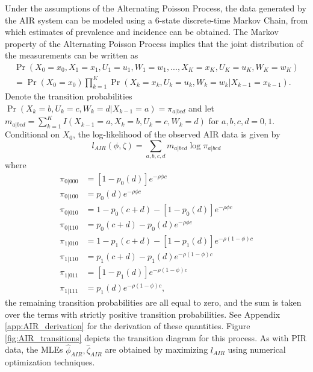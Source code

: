 \documentclass[man, noextraspace, floatsintext]{apa6}\usepackage[]{graphicx}\usepackage[]{color}
\begin{document}
Under the assumptions of the Alternating Poisson Process, the data generated by the AIR system can be modeled using a 6-state discrete-time Markov Chain, from which estimates of prevalence and incidence can be obtained. 
The Markov property of the Alternating Poisson Process implies that the joint distribution of the measurements can be written as
\begin{multline}
\Pr\left(X_0=x_0,X_1=x_1,U_1 = u_1, W_1 = w_1,..., X_K=x_K, U_K = u_K, W_K = w_K \right) \\ = \Pr\left(X_0 = x_0\right) \prod_{k=1}^{K} \Pr\left(X_k = x_k, U_k = u_k, W_k = w_k | X_{k-1} = x_{k-1}\right). 
\end{multline}
Denote the transition probabilities $\Pr\left(X_k = b, U_k = c, W_k = d | X_{k-1} = a\right) = \pi_{a|bcd}$ and let $m_{a|bcd} = \sum_{k=1}^{K} I\left(X_{k-1} = a, X_k = b, U_k = c, W_k = d \right)$ for $a,b,c,d = 0,1$. 
Conditional on $X_0$, the log-likelihood of the observed AIR data is given by
\begin{equation}
\label{eq:AIR_loglik}
l_{AIR}\left(\phi,\zeta\right) = \sum_{a,b,c,d} m_{a|bcd} \log \pi_{a|bcd}
\end{equation}
where 
\begin{align*}
\pi_{0|000} &= \left[1 - p_0(d)\right]e^{-\rho \phi c} \\
\pi_{0|100} &= p_0(d)e^{-\rho \phi c} \\
\pi_{0|010} &= 1 - p_0(c + d) - \left[1 - p_0(d)\right] e^{-\rho \phi c} \\
\pi_{0|110} &= p_0(c + d) - p_0(d) e^{-\rho \phi c} \\
\pi_{1|010} &= 1 - p_1(c + d) - \left[1 - p_1(d)\right] e^{- \rho (1 -\phi) c} \\
\pi_{1|110} &= p_1(c + d) - p_1(d) e^{- \rho (1 -\phi) c} \\
\pi_{1|011} &= \left[1 - p_1(d)\right] e^{- \rho (1 -\phi) c} \\
\pi_{1|111} &= p_1(d) e^{- \rho (1 -\phi) c},
\end{align*}
the remaining transition probabilities are all equal to zero, and the sum is taken over the terms with strictly positive transition probabilities. 
See Appendix \ref{app:AIR_derivation} for the derivation of these quantities. 
Figure \ref{fig:AIR_transitions} depicts the transition diagram for this process.
As with PIR data, the MLEs $\hat\phi_{AIR}, \hat\zeta_{AIR}$ are obtained by maximizing $l_{AIR}$ using numerical optimization techniques. 

\end{document}

